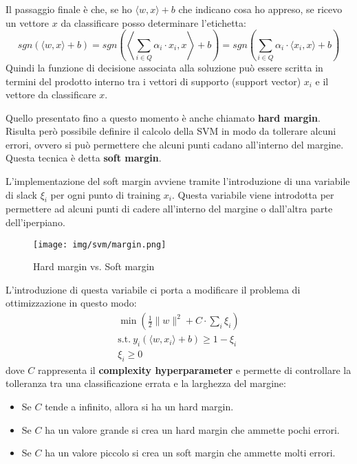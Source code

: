 Il passaggio finale è che, se ho $\langle w, x \rangle + b$ che indicano cosa ho
appreso, se ricevo un vettore $x$ da classificare posso determinare l'etichetta:
\begin{equation}
    sgn(\langle w, x \rangle + b) = sgn\left(\left\langle \sum_{i \in Q} \alpha_i
    \cdot x_i, x \right\rangle + b \right) = sgn\left(\sum_{i \in Q} \alpha_i
    \cdot \langle x_i, x\rangle + b \right)
\end{equation}
Quindi la funzione di decisione associata alla soluzione può essere scritta in
termini del prodotto interno tra i vettori di supporto (support vector) $x_i$ e
il vettore da classificare $x$.

Quello presentato fino a questo momento è anche chiamato \textbf{hard margin}.
Risulta però possibile definire il calcolo della SVM in modo da tollerare alcuni
errori, ovvero si può permettere che alcuni punti cadano all'interno del margine.
Questa tecnica è detta \textbf{soft margin}.

L'implementazione del soft margin avviene tramite l'introduzione di una variabile
di slack $\xi_i$ per ogni punto di training $x_i$. Questa variabile viene
introdotta per permettere ad alcuni punti di cadere all'interno del margine o
dall'altra parte dell'iperpiano.
\begin{figure}[!ht]
    \centering
    \texttt{[image: img/svm/margin.png]}
    \caption{Hard margin vs. Soft margin}
    \label{fig:soft_margin}
\end{figure}
L'introduzione di questa variabile ci porta a modificare il problema di ottimizzazione
in questo modo:
\begin{equation}
    \begin{aligned}
        \min \left(\frac{1}{2} \| w \|^2 + C \cdot \sum_{i} \xi_i \right) \\
        \text{s.t.} \ y_i (\langle w, x_i \rangle + b) \geq 1 - \xi_i     \\
        \xi_i \geq 0
    \end{aligned}
\end{equation}
dove $C$ rappresenta il \textbf{complexity hyperparameter} e permette di
controllare la tolleranza  tra una classificazione errata e la larghezza del 
margine:
\begin{itemize}
    \item Se $C$ tende a infinito, allora si ha un hard margin.
    \item Se $C$ ha un valore grande si crea un hard margin che ammette pochi
          errori.
    \item Se $C$ ha un valore piccolo si crea un soft margin che ammette molti
          errori.
\end{itemize}
